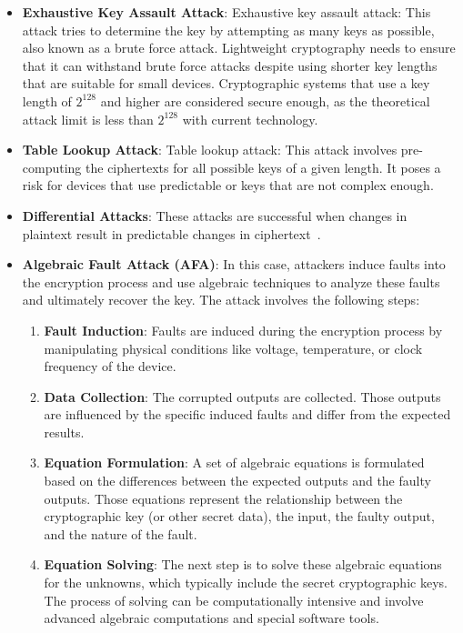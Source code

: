 \begin{itemize}
    \item \textbf{Exhaustive Key Assault Attack}: Exhaustive key assault attack: This attack tries to determine the key by attempting as many keys as possible, also known as a brute force attack. Lightweight cryptography needs to ensure that it can withstand brute force attacks despite using shorter key lengths that are suitable for small devices. Cryptographic systems that use a key length of \( 2^{128} \) and higher are considered secure enough, as the theoretical attack limit is less than \( 2^{128} \) with current technology.
    \item \textbf{Table Lookup Attack}: Table lookup attack: This attack involves pre-computing the ciphertexts for all possible keys of a given length. It poses a risk for devices that use predictable or keys that are not complex enough.
    \item \textbf{Differential Attacks}: These attacks are successful when changes in plaintext result in predictable changes in ciphertext~\cite{ekwueme2024lightweight}.
    \item \textbf{Algebraic Fault Attack (AFA)}: In this case, attackers induce faults into the encryption process and use algebraic techniques to analyze these faults and ultimately recover the key. The attack involves the following steps:
    \begin{enumerate}
        \item \textbf{Fault Induction}: Faults are induced during the encryption process by manipulating physical conditions like voltage, temperature, or clock frequency of the device.
        \item \textbf{Data Collection}: The corrupted outputs are collected. Those outputs are influenced by the specific induced faults and differ from the expected results.
        \item \textbf{Equation Formulation}: A set of algebraic equations is formulated based on the differences between the expected outputs and the faulty outputs. Those equations represent the relationship between the cryptographic key (or other secret data), the input, the faulty output, and the nature of the fault.
        \item \textbf{Equation Solving}: The next step is to solve these algebraic equations for the unknowns, which typically include the secret cryptographic keys. The process of solving can be computationally intensive and involve advanced algebraic computations and special software tools.

\end{enumerate}
\end{itemize}
